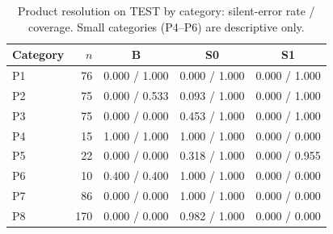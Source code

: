 \begin{table}[t]
\centering
\caption{Product resolution on TEST by category: silent-error rate / coverage. Small categories (P4--P6) are descriptive only.}
\label{tab:prodcat}
\footnotesize
\setlength{\tabcolsep}{4pt}
\begin{tabular}{@{}lrccc@{}}
\toprule
Category & $n$ & B & S0 & S1 \\
\midrule
P1 & 76 & 0.000 / 1.000 & 0.000 / 1.000 & 0.000 / 1.000 \\
P2 & 75 & 0.000 / 0.533 & 0.093 / 1.000 & 0.000 / 1.000 \\
P3 & 75 & 0.000 / 0.000 & 0.453 / 1.000 & 0.000 / 1.000 \\
P4 & 15 & 1.000 / 1.000 & 1.000 / 1.000 & 0.000 / 0.000 \\
P5 & 22 & 0.000 / 0.000 & 0.318 / 1.000 & 0.000 / 0.955 \\
P6 & 10 & 0.400 / 0.400 & 1.000 / 1.000 & 0.000 / 0.000 \\
P7 & 86 & 0.000 / 0.000 & 1.000 / 1.000 & 0.000 / 0.000 \\
P8 & 170 & 0.000 / 0.000 & 0.982 / 1.000 & 0.000 / 0.000 \\
\bottomrule
\end{tabular}
\end{table}
